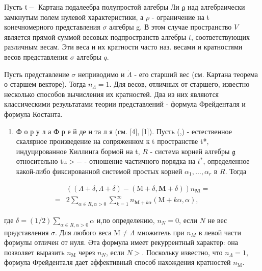 \documentclass[10pt]{article}
\begin{document}
Пусть $\mathfrak{t}-$ Картана подалеебра полупростой алгебры Ли $\mathfrak{g}$ над алгебраически замкнутым полем нулевой характеристики, а $\rho$ - ограничение на t конечномерного представления $\sigma$ алгебры g. В этом случае пространство $V$ является прямой суммой весовых подпространств алгебры $t$, соответствующих различным весам. Эти веса и их кратности часто наз. весами и кратностями весов представления $\sigma$ алгебры $q$.



Пусть представление $\sigma$ неприводимо и $\dot{\Lambda}$ - его старший вес (см. Картана теорема о старшем векторе). Тогда $n_{\Lambda}=1$. Для весов, отличных от старшего, известно несколько способов вычисления их кратностей. Два из них являются классическими результатами теории представлений - формула Фрейденталя и формула Костанта.



\begin{enumerate}

  \item Ф о р у л а Ф р е й де н та л я (см. [4], [1]). Пусть (,) - естественное скалярное произведение на сопряженном к t пространстве t*, индуцированное Киллинга бормой на t, $R$ - система корней алгебры $\mathfrak{g}$ относительно $\mathrm{t} \boldsymbol{\mathrm { u }}>-$ - отношение частичного порядка на $t^{*}$, определенное какой-либо фиксированной системой простых корней $\alpha_{1}, \ldots, \alpha_{r}$ в $R$. Тогда

\end{enumerate}



\[

\begin{aligned}

& ((\Lambda+\delta, \Lambda+\delta)-(\mathrm{M}+\delta, \mathbf{M}+\delta)) n_{\mathbf{M}}= \\

= & 2 \sum_{\alpha \in R, \alpha>0} \sum_{k=1}^{\infty} n_{\mathbf{M}+k \alpha}(\mathrm{M}+k \alpha, \alpha),

\end{aligned}

\]



где $\delta=(1 / 2) \sum_{\alpha \in R, \alpha>0} \alpha$ и,по определению, $n_{N}=0$, если $N$ не вес представления $\sigma$. Для любого веса $\mathrm{M} \neq \Lambda$ множитель при $n_{M}$ в левой части формулы отличен от нуля. Әта формула имеет рекуррентный характер: она позволяет выразить $n_{\mathrm{M}}$ через $n_{N}$, если $N>$. Поскольку известно, что $n_{\Lambda}=1$, формула Фрейденталя дает әффективный способ нахождения кратностей $n_{\mathrm{M}}$.
\end{document}
